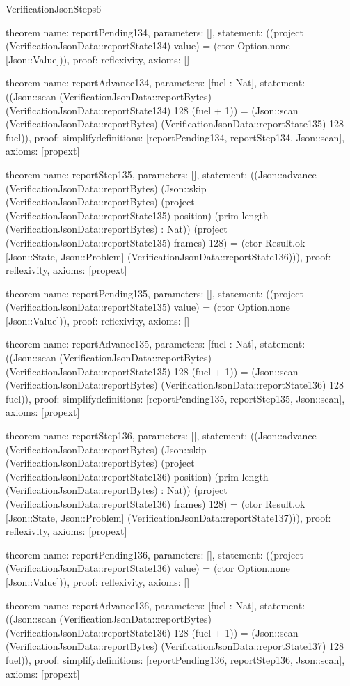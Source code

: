 \begin{lexlean}{VerificationJsonSteps6}
\begin{semanticmodule}
theorem{
  name: reportPending134,
  parameters: [],
  statement: ((project (VerificationJsonData::reportState134) value) = (ctor Option.none [Json::Value])),
  proof: reflexivity{},
  axioms: []
}

theorem{
  name: reportAdvance134,
  parameters: [fuel : Nat],
  statement: ((Json::scan (VerificationJsonData::reportBytes) (VerificationJsonData::reportState134) 128 (fuel + 1)) = (Json::scan (VerificationJsonData::reportBytes) (VerificationJsonData::reportState135) 128 fuel)),
  proof: simplify{definitions: [reportPending134, reportStep134, Json::scan]},
  axioms: [propext]
}

theorem{
  name: reportStep135,
  parameters: [],
  statement: ((Json::advance (VerificationJsonData::reportBytes) (Json::skip (VerificationJsonData::reportBytes) (project (VerificationJsonData::reportState135) position) (prim length (VerificationJsonData::reportBytes) : Nat)) (project (VerificationJsonData::reportState135) frames) 128) = (ctor Result.ok [Json::State, Json::Problem] (VerificationJsonData::reportState136))),
  proof: reflexivity{},
  axioms: [propext]
}

theorem{
  name: reportPending135,
  parameters: [],
  statement: ((project (VerificationJsonData::reportState135) value) = (ctor Option.none [Json::Value])),
  proof: reflexivity{},
  axioms: []
}

theorem{
  name: reportAdvance135,
  parameters: [fuel : Nat],
  statement: ((Json::scan (VerificationJsonData::reportBytes) (VerificationJsonData::reportState135) 128 (fuel + 1)) = (Json::scan (VerificationJsonData::reportBytes) (VerificationJsonData::reportState136) 128 fuel)),
  proof: simplify{definitions: [reportPending135, reportStep135, Json::scan]},
  axioms: [propext]
}

theorem{
  name: reportStep136,
  parameters: [],
  statement: ((Json::advance (VerificationJsonData::reportBytes) (Json::skip (VerificationJsonData::reportBytes) (project (VerificationJsonData::reportState136) position) (prim length (VerificationJsonData::reportBytes) : Nat)) (project (VerificationJsonData::reportState136) frames) 128) = (ctor Result.ok [Json::State, Json::Problem] (VerificationJsonData::reportState137))),
  proof: reflexivity{},
  axioms: [propext]
}

theorem{
  name: reportPending136,
  parameters: [],
  statement: ((project (VerificationJsonData::reportState136) value) = (ctor Option.none [Json::Value])),
  proof: reflexivity{},
  axioms: []
}

theorem{
  name: reportAdvance136,
  parameters: [fuel : Nat],
  statement: ((Json::scan (VerificationJsonData::reportBytes) (VerificationJsonData::reportState136) 128 (fuel + 1)) = (Json::scan (VerificationJsonData::reportBytes) (VerificationJsonData::reportState137) 128 fuel)),
  proof: simplify{definitions: [reportPending136, reportStep136, Json::scan]},
  axioms: [propext]
}


\end{semanticmodule}
\end{lexlean}
